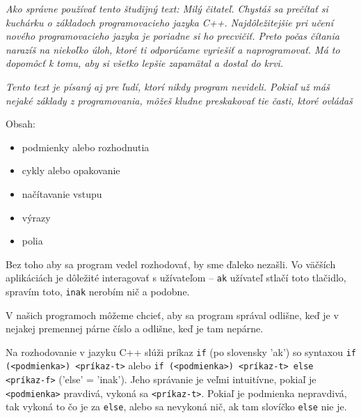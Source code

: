 




\textit{Ako správne používať tento študijný text: Milý čitateľ. Chystáš sa
prečítať si kuchárku o základoch programovacieho jazyka C++. Najdôležitejšie
pri učení nového programovacieho jazyka je poriadne si ho precvičiť. Preto
počas čítania narazíš na niekoľko úloh, ktoré ti odporúčame vyriešiť a
naprogramovať.  Má to dopomôcť k tomu, aby si všetko lepšie zapamätal a dostal
do krvi.}

\textit{Tento text je písaný aj pre ľudí, ktorí nikdy program nevideli. Pokiaľ
už máš nejaké základy z programovania, môžeš kludne preskakovať tie časti,
ktoré ovládaš}

Obsah:
\begin{itemize}
    \item podmienky alebo rozhodnutia
    \item cykly alebo opakovanie 
    \item načítavanie vstupu
    \item výrazy
    \item polia
\end{itemize}

\medskip


Bez toho aby sa program vedel rozhodovať, by sme ďaleko nezašli. Vo väčších
aplikáciách je dôležité interagovať s užívateľom -- \verb!ak! užívateľ stlačí
toto tlačidlo, spravím toto, \verb!inak!  nerobím nič a podobne. 

V našich programoch môžeme chcieť, aby sa program správal odlišne, keď je v
nejakej premennej párne číslo a odlišne, keď je tam nepárne.

Na rozhodovanie v jazyku C++ slúži príkaz \verb!if! (po slovensky 'ak') so
syntaxou \verb!if (<podmienka>) <príkaz-t>! alebo \verb!if (<podmienka>) <príkaz-t> else <príkaz-f>!
('else' = 'inak'). Jeho správanie je veľmi intuitívne, pokiaľ je
\verb!<podmienka>! pravdivá, vykoná sa \verb!<príkaz-t>!.  Pokiaľ je podmienka
nepravdivá, tak vykoná to čo je za \verb!else!, alebo sa nevykoná nič, ak tam
slovíčko \verb!else! nie je.

